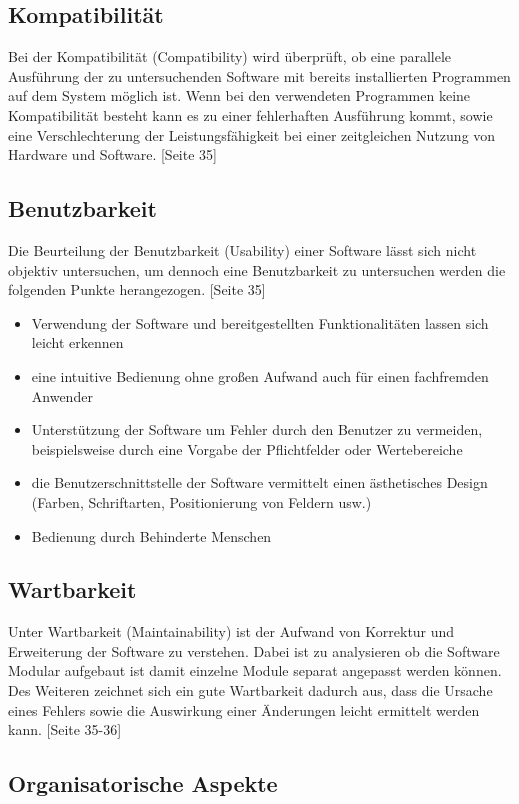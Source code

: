 \subsection*{Kompatibilität}
Bei der Kompatibilität (Compatibility) wird überprüft, ob eine parallele Ausführung der zu untersuchenden Software mit bereits installierten Programmen auf dem System möglich ist. Wenn bei den verwendeten Programmen keine Kompatibilität besteht kann es zu einer fehlerhaften Ausführung kommt, sowie eine Verschlechterung der Leistungsfähigkeit bei einer zeitgleichen Nutzung von Hardware und Software. \cite{BUND12}[Seite 35]
\subsection*{Benutzbarkeit}
Die Beurteilung der Benutzbarkeit (Usability) einer Software lässt sich nicht objektiv untersuchen, um dennoch eine Benutzbarkeit zu untersuchen werden die folgenden Punkte herangezogen. \cite{BUND12}[Seite 35]
\begin{itemize}
  \item Verwendung der Software und bereitgestellten Funktionalitäten lassen sich leicht erkennen
  \item eine intuitive Bedienung ohne großen Aufwand auch für einen fachfremden Anwender
  \item Unterstützung der Software um Fehler durch den Benutzer zu vermeiden, beispielsweise durch eine Vorgabe der Pflichtfelder oder Wertebereiche
  \item die Benutzerschnittstelle der Software vermittelt einen ästhetisches Design (Farben, Schriftarten, Positionierung von Feldern usw.)
  \item Bedienung durch Behinderte Menschen
\end{itemize}
\subsection*{Wartbarkeit}
Unter Wartbarkeit (Maintainability) ist der Aufwand von Korrektur und Erweiterung der Software zu verstehen. Dabei ist zu analysieren ob die Software Modular aufgebaut ist damit einzelne Module separat angepasst werden können. Des Weiteren zeichnet sich ein gute Wartbarkeit dadurch aus, dass die Ursache eines Fehlers sowie die Auswirkung einer Änderungen leicht ermittelt werden kann. \cite{BUND12}[Seite 35-36]
\subsection{Organisatorische Aspekte}


